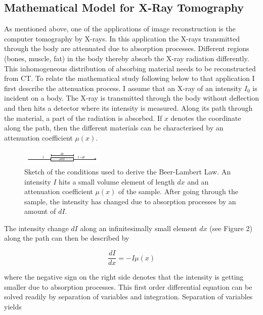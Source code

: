 \documentclass[12pt]{article}
\begin{document}
\subsection{Mathematical Model for X-Ray Tomography}
As mentioned above, one of the applications of image reconstruction is the computer tomography by X-rays. In this application the X-rays transmitted through the body are attenuated due to absorption processes. Different regions (bones, muscle, fat) in the body thereby absorb the X-ray radiation differently.  This inhomogeneous distribution of absorbing material needs to be reconstructed from CT. To relate the mathematical study following below to that application I first describe the attenuation process. 
I assume that an X-ray of an intensity $I_{0}$ is incident on a body. The X-ray is transmitted through the body without deflection and then hits a detector where its intensity is measured. Along its path through the material, a part of the radiation is absorbed. If $x$ denotes the coordinate along the path, then the different materials can be characterised by an attenuation coefficient $\mu(x)$. 
\begin{figure}[hbt]\label{fig.2}
	\includegraphics[width = .6\textwidth]{theory/beer_lambert_law}
	\caption{Sketch of the conditions used to derive the Beer-Lambert Law. An intensity $I$ hits a small volume element of length $dx$ and an attenuation coefficient $\mu(x)$ of the sample. After going through the sample, the intensity has changed due to absorption processes by an amount of $dI$.}
\end{figure}
The intensity change $dI$ along an infinitesimally small element $dx$ (see Figure 2) along the path can then be described by

\begin{equation}\label{eq.1}
	\frac{dI}{dx} = -I\mu(x)
\end{equation}

where the negative sign on the right side denotes that the intensity is getting smaller due to absorption processes. This first order differential equation can be solved readily by separation of variables and integration. Separation of variables yields
\end{document}
